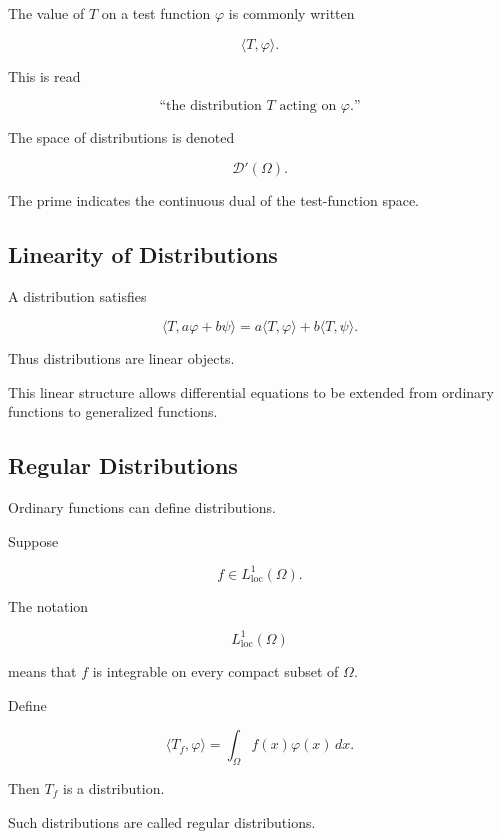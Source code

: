 The value of \(T\) on a test function \(\varphi\) is commonly written

\[
\boxed{
\langle T,\varphi\rangle.
}
\]

This is read

\[
\boxed{
\text{``the distribution \(T\) acting on \(\varphi\).''}
}
\]

The space of distributions is denoted

\[
\boxed{
\mathcal{D}'(\Omega).
}
\]

The prime indicates the continuous dual of the test-function space.

\subsection{Linearity of Distributions}
\label{subsec:distribution-linearity}

A distribution satisfies

\[
\boxed{
\langle T,
a\varphi+b\psi\rangle
=
a\langle T,\varphi\rangle
+
b\langle T,\psi\rangle.
}
\]

Thus distributions are linear objects.

This linear structure allows differential equations to be extended from
ordinary functions to generalized functions.

\subsection{Regular Distributions}
\label{subsec:regular-distributions}

Ordinary functions can define distributions.

Suppose

\[
f\in L_{\mathrm{loc}}^1(\Omega).
\]

The notation

\[
L_{\mathrm{loc}}^1(\Omega)
\]

means that \(f\) is integrable on every compact subset of \(\Omega\).

Define

\[
\boxed{
\langle T_f,\varphi\rangle
=
\int_\Omega
f(x)\varphi(x)\,dx.
}
\]

Then \(T_f\) is a distribution.

Such distributions are called regular distributions.

